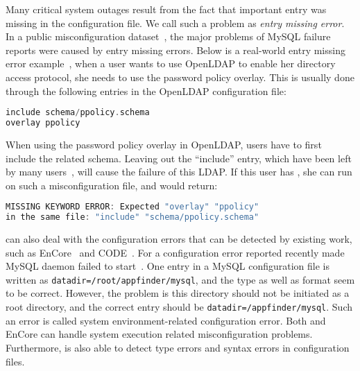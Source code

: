 Many critical system outages result from the fact that important
entry was missing in the configuration file. 
We call such a problem as {\em entry missing error}.
In a public misconfiguration dataset~\cite{configdataset},
the major problems of MySQL failure reports were caused by
entry missing errors.
Below is a real-world entry missing error example~\cite{yin11anempirical},
when a user wants to use OpenLDAP to enable her directory access
protocol, she needs to use the password policy overlay. This is usually
done through the following entries in the OpenLDAP configuration file:

\begin{lstlisting}[language=C, xleftmargin=.01\textwidth]
include schema/ppolicy.schema
overlay ppolicy
\end{lstlisting} 

When using the password policy overlay in OpenLDAP, 
users have to first include the related schema.
Leaving out the ``include'' entry, 
which have been left by many users~\cite{yin11anempirical}, 
will cause the failure of this LDAP. 
If this user has \app, she can run \app on such a misconfiguration file,
and \app would return:

\begin{lstlisting}[language=C, xleftmargin=.01\textwidth]
MISSING KEYWORD ERROR: Expected "overlay" "ppolicy"
in the same file: "include" "schema/ppolicy.schema"
\end{lstlisting} 


\app can also deal with the configuration errors that can be detected by
existing work, such as EnCore~\cite{zhang14encore} and
CODE~\cite{yuan11context}.
For a configuration error reported recently made MySQL
daemon failed to start~\cite{syserror}.
One entry in a MySQL configuration file is written as 
{\tt datadir=/root/appfinder/mysql}, and the type as well as 
format seem to be correct.
However, the problem is this directory should not be
initiated as a root directory, and the correct entry
should be {\tt datadir=/appfinder/mysql}.
Such an error is called system environment-related configuration error.
Both \app and EnCore can handle system execution related
misconfiguration problems.
Furthermore, \app is also able to detect type errors and syntax errors
in configuration files.
